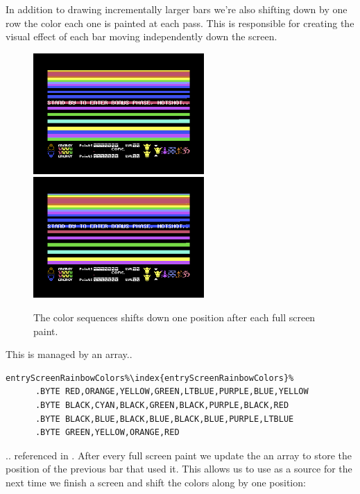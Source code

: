 In addition to drawing incrementally larger bars we're also shifting down by one row the color each one is painted
at each pass. This is responsible for creating the visual effect of each bar moving independently
down the screen.

\begin{figure}[H]
    \centering
    \includegraphics[width=6.5cm]{bonusphase/entry/bonus_entry_from.png}%
    \includegraphics[width=6.5cm]{bonusphase/entry/bonus_entry_to.png}%
  \caption{The color sequences shifts down one position after each full screen paint.}
\end{figure}

This is managed by an array..

\begin{lstlisting}[escapechar=\%]
entryScreenRainbowColors%\index{entryScreenRainbowColors}%
      .BYTE RED,ORANGE,YELLOW,GREEN,LTBLUE,PURPLE,BLUE,YELLOW
      .BYTE BLACK,CYAN,BLACK,GREEN,BLACK,PURPLE,BLACK,RED
      .BYTE BLACK,BLUE,BLACK,BLUE,BLACK,BLUE,PURPLE,LTBLUE
      .BYTE GREEN,YELLOW,ORANGE,RED
\end{lstlisting}

.. referenced in . After every full screen paint we update the an
array  to store the position of the previous bar that used it.
This allows us to use  as a source for  the next time
we finish a screen and shift the colors along by one position:

